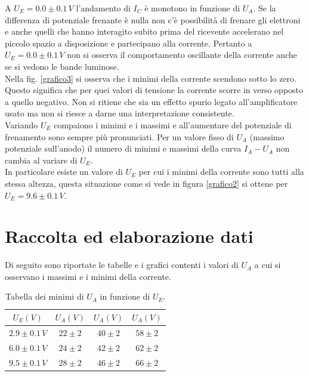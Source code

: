 \documentclass[10pt,a4paper]{article}
\begin{document}
A $U_E = 0.0 \pm0.1\, V$ l'andamento di $I_C$ è monotono in funzione di $U_A$.
Se la differenza di potenziale frenante è nulla non c'è possibilità di frenare gli elettroni e anche quelli che hanno interagito subito prima del ricevente accelerano nel piccolo spazio a disposizione e partecipano alla corrente. Pertanto a $U_E = 0.0\pm0.1\,V$ non si osserva il comportamento oscillante della corrente anche se si vedono le bande luminose.\\ 
Nella fig. \ref{grafico3} si osserva che i minimi della corrente scendono sotto lo zero. Questo significa che per quei valori di tensione la corrente scorre in verso opposto a quello negativo. Non si ritiene che sia un effetto spurio legato all'amplificatore usato ma non si riesce a darne una interpretazione consistente.\\
Variando $U_E$ compaiono i minimi e i massimi e all'aumentare del potenziale di frenamento sono sempre più pronunciati. Per un valore fisso di $U_A$ (massimo potenziale sull'anodo) il numero di minimi e massimi della curva $I_A-U_A$ non cambia al variare di $U_E$.\\

In particolare esiste un valore di $U_E$ per cui i minimi della corrente sono tutti alla stessa altezza, questa situazione come si vede in figura \ref{grafico2} si ottene per $U_E = 9.6 \pm0.1 \, V$.\\

\section{Raccolta ed elaborazione dati}

Di seguito sono riportate le tabelle e i grafici contenti i valori di $U_A$ a cui si osservano i massimi e i minimi della corrente.\\

\begin{table}[!htb]
\centering
\begin{tabular}{|c|c|c|c|}
\hline 
$U_E (V)$ & $U_A (V)$ & $U_A (V)$ & $U_A (V)$ \\ 
\hline 
$2.9\pm0.1\,V$ & $22\pm2$ & $40\pm2$ & $58\pm2$ \\ 
\hline 
$6.0\pm0.1\,V$ & $24\pm2$ & $42\pm2$ & $62\pm2$ \\ 
\hline 
$9.5\pm0.1\,V$ & $28\pm2$ & $46\pm2$ & $66\pm2$ \\ 
\hline 
\end{tabular}
\caption{Tabella dei minimi di $U_A$ in funzione di $U_E$.}
\label{tabellaMinimi} 
\end{table}
\end{document}
